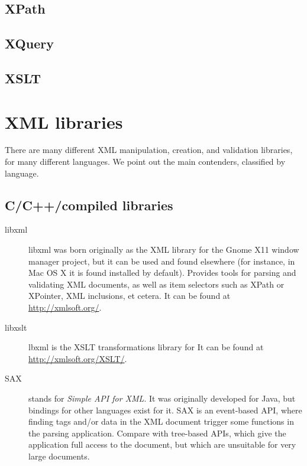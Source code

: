 {			
			
		
		\subsection{XPath} %
		\label{sub:xpath}
		
		\subsection{XQuery} %
		\label{sub:xquery}
		
		\subsection{XSLT} %
		\label{sub:xslt}
		
	
	\section{XML libraries} %
	\label{sec:xml_libraries}
		There are many different XML manipulation, creation, and
		validation libraries, for many different languages. We
		point out the main contenders, classified by language.
		
		\subsection{C/C++/compiled libraries} %
		\label{sub:c_cpp_compiled}
			\begin{description}
				\item[libxml] libxml was born originally as the XML
				library for the Gnome X11 window manager project,
				but it can be used and found elsewhere (for
				instance, in Mac OS X it is found installed by
				default). Provides tools for parsing and validating
				XML documents, as well as item selectors such as
				XPath or XPointer, XML inclusions, et cetera. It
				can be found at \url{http://xmlsoft.org/}.
				
				 \item[libxslt] lbxml is the XSLT transformations
				library for It can be found at
				\url{http://xmlsoft.org/XSLT/}.
				
				 \item[SAX] stands for \emph{Simple API for XML}.
				It was originally developed for Java, but bindings
				for other languages exist for it. SAX is an
				event-based API, where finding tags and/or data in
				the XML document trigger some functions in the
				parsing application. Compare with tree-based APIs,
				which give the application full access to the
				document, but which are unsuitable for very large
				documents.
			\end{description}
			
	}

